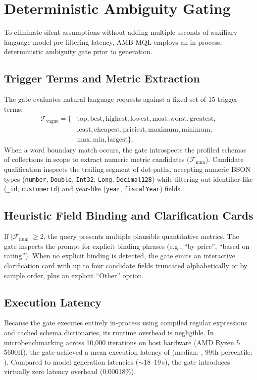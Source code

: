 \section{Deterministic Ambiguity Gating}
\label{sec:gate}

To eliminate silent assumptions without adding multiple seconds of auxiliary language-model pre-filtering latency, AMB-MQL employs an in-process, deterministic ambiguity gate prior to generation.



\subsection{Trigger Terms and Metric Extraction}
The gate evaluates natural language requests against a fixed set of 15 trigger terms:
\begin{align*}
\mathcal{T}_{\text{vague}} = \{ & \text{top}, \text{best}, \text{highest}, \text{lowest}, \text{most}, \text{worst}, \text{greatest}, \\
& \text{least}, \text{cheapest}, \text{priciest}, \text{maximum}, \text{minimum}, \\
& \text{max}, \text{min}, \text{largest} \}.
\end{align*}
When a word boundary match occurs, the gate introspects the profiled schemas of collections in scope to extract numeric metric candidates ($\mathcal{F}_{\text{num}}$). Candidate qualification inspects the trailing segment of dot-paths, accepting numeric BSON types (\texttt{number}, \texttt{Double}, \texttt{Int32}, \texttt{Long}, \texttt{Decimal128}) while filtering out identifier-like (\texttt{\_id}, \texttt{customerId}) and year-like (\texttt{year}, \texttt{fiscalYear}) fields.

\subsection{Heuristic Field Binding and Clarification Cards}
If $|\mathcal{F}_{\text{num}}| \ge 2$, the query presents multiple plausible quantitative metrics. The gate inspects the prompt for explicit binding phrases (e.g., ``by price'', ``based on rating''). When no explicit binding is detected, the gate emits an interactive clarification card with up to four candidate fields truncated alphabetically or by sample order, plus an explicit ``Other'' option.

\subsection{Execution Latency}
Because the gate executes entirely in-process using compiled regular expressions and cached schema dictionaries, its runtime overhead is negligible. In microbenchmarking across 10,000 iterations on host hardware (AMD Ryzen 5 5600H), the gate achieved a mean execution latency of \gateLatencyMean{} (median: \gateLatencyPFifty{}, 99th percentile: \gateLatencyPNineNine{}). Compared to model generation latencies ($\sim$18--19\,s), the gate introduces virtually zero latency overhead (0.00018\%).
